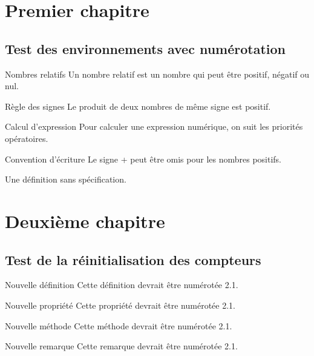 \documentclass{book}
\begin{document}
\chapter{Premier chapitre}

\section{Test des environnements avec numérotation}

\begin{definitionbox}{Nombres relatifs}
Un nombre relatif est un nombre qui peut être positif, négatif ou nul.
\end{definitionbox}

\begin{proprietebox}{Règle des signes}
Le produit de deux nombres de même signe est positif.
\end{proprietebox}

\begin{methodebox}{Calcul d'expression}
Pour calculer une expression numérique, on suit les priorités opératoires.
\end{methodebox}

\begin{remarkbox}{Convention d'écriture}
Le signe + peut être omis pour les nombres positifs.
\end{remarkbox}

\begin{definitionbox}
Une définition sans spécification.
\end{definitionbox}

\chapter{Deuxième chapitre}

\section{Test de la réinitialisation des compteurs}

\begin{definitionbox}{Nouvelle définition}
Cette définition devrait être numérotée 2.1.
\end{definitionbox}

\begin{proprietebox}{Nouvelle propriété}
Cette propriété devrait être numérotée 2.1.
\end{proprietebox}

\begin{methodebox}{Nouvelle méthode}
Cette méthode devrait être numérotée 2.1.
\end{methodebox}

\begin{remarkbox}{Nouvelle remarque}
Cette remarque devrait être numérotée 2.1.
\end{remarkbox}
\end{document}
